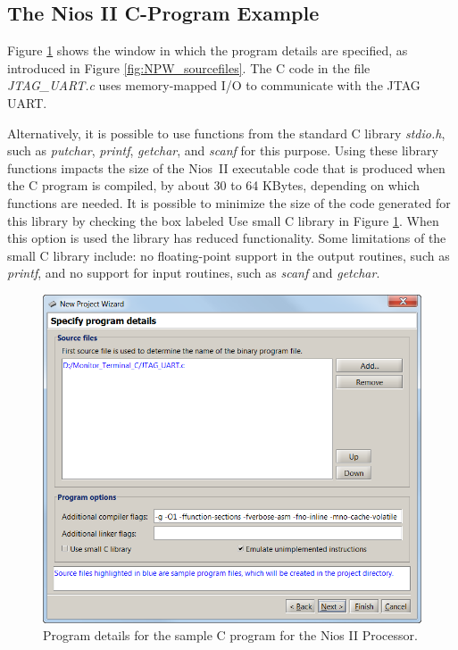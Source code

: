\documentclass[11pt, twoside, pdftex]{article}
\begin{document}
\subsection{The Nios II C-Program Example}
\label{tut:nios_7}

Figure \ref{fig:NPW_programdetails_nios} shows the window in which the program details are
specified, as introduced in Figure \ref{fig:NPW_sourcefiles}.
The C code in the file {\it JTAG\_UART.c} uses memory-mapped 
I/O to communicate with the JTAG UART. 

Alternatively, it is possible to
use functions from the standard C library {\it stdio.h}, such as
{\it putchar}, {\it printf}, {\it getchar}, and {\it scanf} for
this purpose.  Using these library functions impacts the size of
the Nios~II executable code that is produced when the C program
is compiled, by about 30 to 64 KBytes, depending on
which functions are needed.  It is possible to minimize the size
of the code generated for this library by checking the box labeled {\sf Use small C library} in 
Figure \ref{fig:NPW_programdetails_nios}. When this option is used the
library has reduced functionality. 
Some limitations of the small C library include: 
no floating-point support in the output routines, 
such as {\it printf}, and no support for input routines, 
such as {\it scanf} and {\it getchar}.
~\\

\begin{figure}[H]
   \begin{center}
      \includegraphics[scale=1]{screenshots/figure47.png}
   \end{center}
   \caption{Program details for the sample C program for the Nios II Processor.} 
   \label{fig:NPW_programdetails_nios}
\end{figure}
\end{document}
